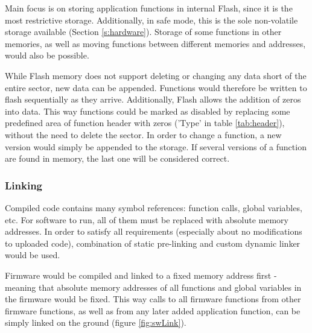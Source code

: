 Main focus is on storing application functions in internal Flash, since it is the most restrictive storage. Additionally, in safe mode, this is the sole non-volatile storage available (Section \ref{s:hardware}). Storage of some functions in other memories, as well as moving functions between different memories and addresses, would also be possible.

While Flash memory does not support deleting or changing any data short of the entire sector, new data can be appended. Functions would therefore be written to flash sequentially as they arrive. Additionally, Flash allows the addition of zeros into data. This way functions could be marked as disabled by replacing some predefined area of function header with zeros ('Type' in table \ref{tab:header}), without the need to delete the sector. In order to change a function, a new version would simply be appended to the storage. If several versions of a function are found in memory, the last one will be considered correct.

\subsubsection{Linking}

Compiled code contains many symbol references: function calls, global variables, etc. For software to run, all of them must be replaced with absolute memory addresses. In order to satisfy all requirements (especially about no modifications to uploaded code), combination of static pre-linking and custom dynamic linker would be used.

Firmware would be compiled and linked to a fixed memory address first - meaning that absolute memory addresses of all functions and global variables in the firmware would be fixed. This way calls to all firmware functions from other firmware functions, as well as from any later added application function, can be simply linked on the ground (figure \ref{fig:swLink}).


